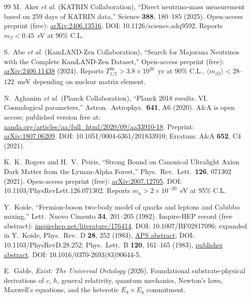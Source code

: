 ﻿\documentclass[reprint,amsmath,amssymb,aps,prd,longbibliography,floatfix]{revtex4-2}
\begin{document}
\begin{thebibliography}{99}
 M.~Aker \textit{et al.} (KATRIN Collaboration),
``Direct neutrino-mass measurement based on 259 days of KATRIN data,''
Science \textbf{388}, 180--185 (2025).
Open-access preprint (free): \href{https://arxiv.org/abs/2406.13516}{arXiv:2406.13516}.
DOI: 10.1126/science.adq9592.
Reports $m_\beta < 0.45$~eV at 90\% C.L.

 S.~Abe \textit{et al.} (KamLAND-Zen Collaboration),
``Search for Majorana Neutrinos with the Complete KamLAND-Zen Dataset,''
Open-access preprint (free): \href{https://arxiv.org/abs/2406.11438}{arXiv:2406.11438} (2024).
Reports $T_{1/2}^{0\nu} > 3.8 \times 10^{26}$~yr at 90\% C.L.,
$\langle m_{\beta\beta}\rangle < 28$--$122$~meV depending on nuclear matrix element.

 N.~Aghanim \textit{et al.} (Planck Collaboration),
``Planck 2018 results. VI. Cosmological parameters,''
Astron.\ Astrophys.\ \textbf{641}, A6 (2020).
A\&A is open access; published version free at:
\href{https://www.aanda.org/articles/aa/full_html/2020/09/aa33910-18/aa33910-18.html}{aanda.org/articles/aa/full\_html/2020/09/aa33910-18}.
Preprint: \href{https://arxiv.org/abs/1807.06209}{arXiv:1807.06209}.
DOI: 10.1051/0004-6361/201833910;
Erratum: A\&A \textbf{652}, C4 (2021).

 K.~K.~Rogers and H.~V.~Peiris,
``Strong Bound on Canonical Ultralight Axion Dark Matter from the Lyman-Alpha Forest,''
Phys.\ Rev.\ Lett.\ \textbf{126}, 071302 (2021).
Open-access preprint (free): \href{https://arxiv.org/abs/2007.12705}{arXiv:2007.12705}.
DOI: 10.1103/PhysRevLett.126.071302.
Reports $m_a > 2 \times 10^{-20}$~eV at 95\% C.L.

 Y.~Koide,
``Fermion-boson two-body model of quarks and leptons and Cabibbo mixing,''
Lett.\ Nuovo Cimento \textbf{34}, 201--205 (1982).
Inspire-HEP record (free abstract):
\href{https://inspirehep.net/literature/176414}{inspirehep.net/literature/176414}.
DOI: 10.1007/BF02817096;
expanded in
Y.~Koide, Phys.\ Rev.\ D \textbf{28}, 252 (1983),
\href{https://journals.aps.org/prd/abstract/10.1103/PhysRevD.28.252}{APS abstract};
DOI: 10.1103/PhysRevD.28.252;
Phys.\ Lett.\ B \textbf{120}, 161--165 (1983),
\href{https://www.sciencedirect.com/science/article/abs/pii/0370269383906445}{publisher abstract}.
DOI: 10.1016/0370-2693(83)90644-5.

 E.~Gable, \textit{Exist: The Universal Ontology}
(2026). Foundational substrate-physical derivations of $c$, $\hbar$,
general relativity, quantum mechanics, Newton's laws, Maxwell's
equations, and the heterotic $E_8 \times E_8$ commitment.


\end{thebibliography}
\end{document}
